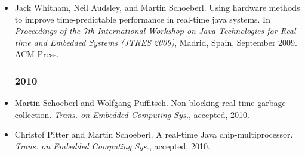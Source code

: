 \begin{itemize}
\item Jack Whitham, Neil Audsley, and Martin Schoeberl. Using
    hardware methods to improve time-predictable performance in
  real-time java systems. In {\em Proceedings of the 7th
International Workshop on Java
  Technologies for Real-time and Embedded Systems (JTRES 2009)},
  Madrid, Spain, September 2009. ACM Press.


\subsubsection*{2010}

\item Martin Schoeberl and Wolfgang Puffitsch. Non-blocking
    real-time garbage collection. {\em Trans. on Embedded
    Computing Sys.}, accepted, 2010.

\item Christof Pitter and Martin Schoeberl. A real-time {Java}
    chip-multiprocessor. {\em Trans. on Embedded Computing Sys.},
    accepted, 2010.

\end{itemize}
